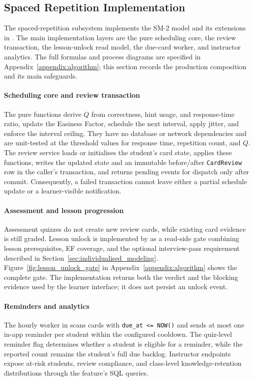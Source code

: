 \subsection{Spaced Repetition Implementation}
\label{sec:impl_sr}

The spaced-repetition subsystem implements the SM-2 model and its extensions in . The main implementation layers are the pure scheduling core, the review transaction, the lesson-unlock read model, the due-card worker, and instructor analytics. The full formulas and process diagrams are specified in Appendix~\ref{appendix:algorithm}; this section records the production composition and its main safeguards.

\paragraph{Scheduling core and review transaction}
The pure  functions derive $Q$ from correctness, hint usage, and response-time ratio, update the Easiness Factor, schedule the next interval, apply jitter, and enforce the interval ceiling. They have no database or network dependencies and are unit-tested at the threshold values for response time, repetition count, and $Q$. The review service loads or initialises the student's card state, applies these functions, writes the updated state and an immutable before/after \texttt{CardReview} row in the caller's transaction, and returns pending events for dispatch only after commit. Consequently, a failed transaction cannot leave either a partial schedule update or a learner-visible notification.

\paragraph{Assessment and lesson progression}
Assessment quizzes do not create new review cards, while existing card evidence is still graded. Lesson unlock is implemented by  as a read-side gate combining lesson prerequisites, EF coverage, and the optional interview-pass requirement described in Section~\ref{sec:individualised_modeling}. Figure~\ref{fig:lesson_unlock_gate} in Appendix~\ref{appendix:algorithm} shows the complete gate. The implementation returns both the verdict and the blocking evidence used by the learner interface; it does not persist an unlock event.

\paragraph{Reminders and analytics}
The hourly worker in  scans cards with \texttt{due\_at <= NOW()} and sends at most one in-app reminder per student within the configured cooldown. The quiz-level reminder flag determines whether a student is eligible for a reminder, while the reported count remains the student's full due backlog. Instructor endpoints expose at-risk students, review compliance, and class-level knowledge-retention distributions through the feature's SQL queries.

